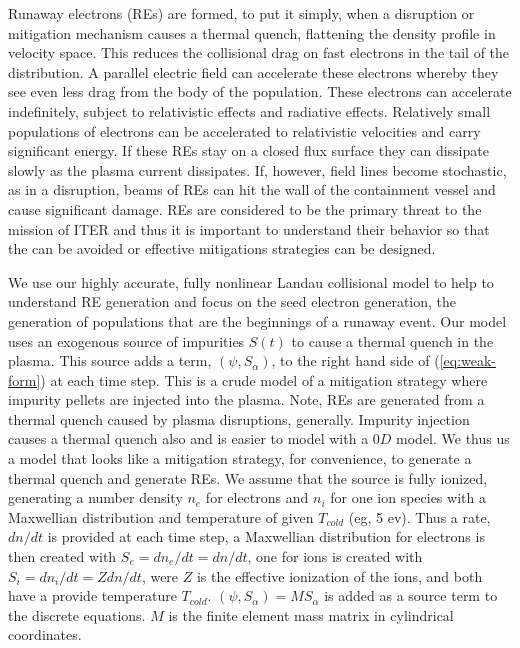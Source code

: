 \documentclass[12pt]{siamart}
\begin{document}
Runaway electrons (REs) are formed, to put it simply, when a disruption or mitigation mechanism causes a thermal quench, flattening the density profile in velocity space.
This reduces the collisional drag on fast electrons in the tail of the distribution.
A parallel electric field can accelerate these electrons whereby they see even less drag from the body of the population.
These electrons can accelerate indefinitely, subject to relativistic effects and radiative effects.
Relatively small populations of electrons can be accelerated to relativistic velocities and carry significant energy.
If these REs stay on a closed flux surface they can dissipate slowly as the plasma current dissipates.
If, however, field lines become stochastic, as in a disruption, beams of REs can hit the wall of the containment vessel and cause significant damage.
REs are considered to be the primary threat to the mission of ITER and thus it is important to understand their behavior so that the can be avoided or effective mitigations strategies can be designed.

We use our highly accurate, fully nonlinear Landau collisional model to help to understand RE generation and focus on the seed electron generation, the generation of populations that are the beginnings of a runaway event.
Our model uses an exogenous source of impurities $S\left(t\right)$ to cause a thermal quench in the plasma.
This source adds a term, $\left(\psi,S_{\alpha}\right)$, to the right hand side of  (\ref{eq:weak-form}) at each time step.
This is a crude model of a mitigation strategy where impurity pellets are injected into the plasma.
Note, REs are generated from a thermal quench caused by plasma disruptions, generally.
Impurity injection causes a thermal quench also and is easier to model with a $0D$ model.
We thus us a model that looks like a mitigation strategy, for convenience, to generate a thermal quench and generate REs.
We assume that the source is fully ionized, generating a number density $n_e$ for electrons and $n_i$ for one ion species with a Maxwellian distribution and temperature of given $T_{cold}$ (eg, 5 ev).
Thus a rate, $dn/dt$ is provided at each time step, a Maxwellian distribution for electrons is then created with $S_e = dn_e/dt =  dn/dt$, one for ions is created with $S_i = dn_i/dt =  Z dn/dt$, were $Z$ is the effective ionization of the ions, and both have a provide temperature $T_{cold}$.
$\left(\psi,S_{\alpha}\right) = M S_\alpha$ is added as a source term to the discrete equations.
$M$ is the finite element mass matrix in cylindrical coordinates.
\end{document}
